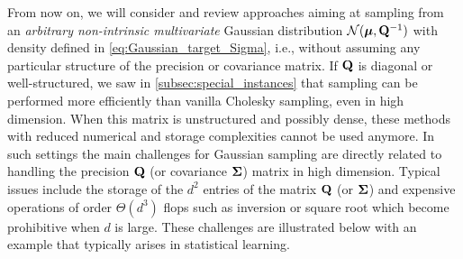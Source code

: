 \documentclass[nohypdvips,onefignum,onetabnum]{siamart171218}
\begin{document}
From now on, we will consider and review approaches aiming at sampling from an {\em arbitrary non-intrinsic multivariate} Gaussian distribution $\mathcal{N}(\boldsymbol{\mu},\mathbf{Q}^{-1})$ with density defined in \cref{eq:Gaussian_target_Sigma}, i.e., without assuming any particular structure of the precision or covariance matrix.
If $\mathbf{Q}$ is diagonal or well-structured, we saw in \cref{subsec:special_instances} that sampling can be performed more efficiently than vanilla Cholesky sampling, even in high dimension.
When this matrix is unstructured and possibly dense, these methods with reduced numerical and storage complexities cannot be used anymore. 
In such settings the main challenges for Gaussian sampling are directly related to handling the precision $\mathbf{Q}$ (or covariance $\mathbf{\Sigma}$) matrix in high dimension.
Typical issues include the storage of the $d^2$ entries of the matrix $\mathbf{Q}$ (or $\mathbf{\Sigma}$) and expensive operations of order $\Theta(d^3)$ flops such as inversion or square root which become prohibitive when $d$ is large.
These challenges are illustrated below with an example that typically arises in statistical learning.
\end{document}
